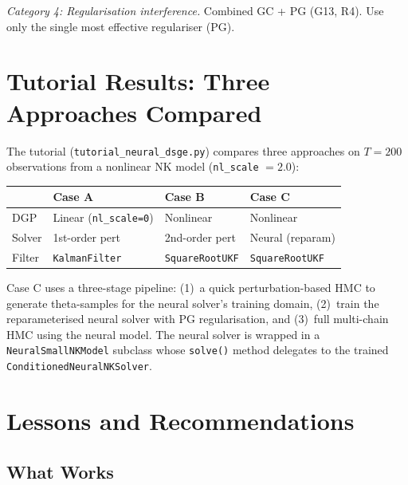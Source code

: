 \documentclass[11pt,a4paper]{article}
\theoremstyle{definition}
\newcommand{\code}[1]{\texttt{\color{codecolor}#1}}
\begin{document}
	\emph{Category 4: Regularisation interference.}
	Combined GC + PG (G13, R4).
	Use only the single most effective regulariser (PG).
	
	
	\section{Tutorial Results: Three Approaches Compared}
	\label{sec:tutorial}
	
	The tutorial (\code{tutorial\_neural\_dsge.py}) compares three approaches on $T = 200$ observations from a nonlinear NK model (\code{nl\_scale} $= 2.0$):
	
	\begin{center}
		\begin{tabular}{llll}
			\toprule
			& \textbf{Case A} & \textbf{Case B} & \textbf{Case C} \\
			\midrule
			DGP & Linear (\code{nl\_scale=0}) & Nonlinear & Nonlinear \\
			Solver & 1st-order pert & 2nd-order pert & Neural (reparam) \\
			Filter & \code{KalmanFilter} & \code{SquareRootUKF} & \code{SquareRootUKF} \\
			\bottomrule
		\end{tabular}
	\end{center}
	
	Case C uses a three-stage pipeline: (1)~a quick perturbation-based HMC to generate theta-samples for the neural solver's training domain, (2)~train the reparameterised neural solver with PG regularisation, and (3)~full multi-chain HMC using the neural model.
	The neural solver is wrapped in a \code{NeuralSmallNKModel} subclass whose \code{solve()} method delegates to the trained \code{ConditionedNeuralNKSolver}.
	
	
	\section{Lessons and Recommendations}
	\label{sec:lessons}
	
	\subsection{What Works}
	
\end{document}
